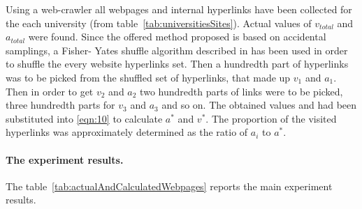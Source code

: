 Using a web-crawler all webpages and internal hyperlinks have been collected for the each university (from table~\cref{tab:universitiesSites}). Actual values of \(v_{total}\) and \(a_{total}\) were found. Since the offered method proposed is based on accidental samplings, a Fisher- Yates shuffle algorithm described in \cite{FisherYates} has been used in order to shuffle the every website hyperlinks set. Then a hundredth part of hyperlinks was to be picked from the shuffled set of hyperlinks, that made up \(v_1\) and \(a_1\). Then in order to get \(v_2\) and \(a_2\)
two hundredth parts of links were to be picked, three hundredth parts for \(v_3\) and \(a_3\) and so on. The obtained values and had been substituted into \cref{eqn:10} to calculate \(a^*\) and \(v^*\). The proportion of the visited hyperlinks was approximately determined as the ratio of \(a_i\) to \(a^*\).

\paragraph{The experiment results.} The table~\cref{tab:actualAndCalculatedWebpages} reports the main experiment results.


